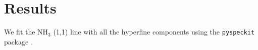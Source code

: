\section{Results}

We fit the NH$_3$ (1,1) line with all the hyperfine components using the \verb+pyspeckit+ package \cite{2011ascl.soft09001G}. 
  